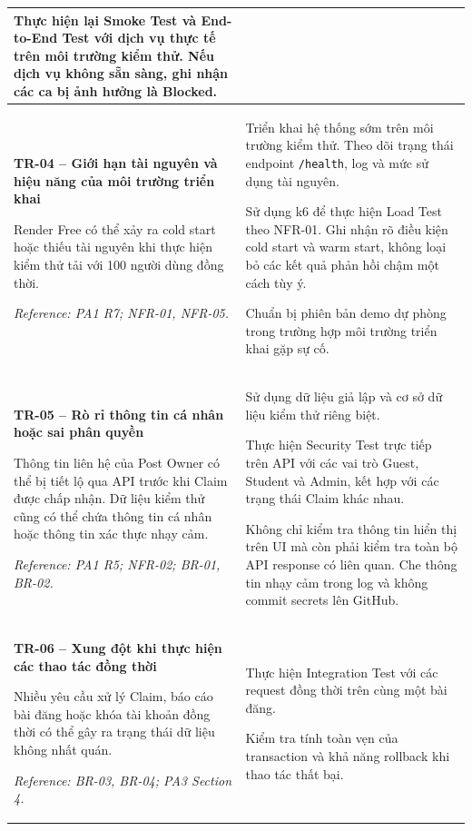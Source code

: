 \begin{longtable}{|p{}|p{}|}
Thực hiện lại Smoke Test và End-to-End Test 
với dịch vụ thực tế trên môi trường kiểm thử. 
Nếu dịch vụ không sẵn sàng, ghi nhận các ca 
bị ảnh hưởng là Blocked.
\\ \hline

\textbf{TR-04 -- Giới hạn tài nguyên và hiệu năng 
của môi trường triển khai}

Render Free có thể xảy ra cold start hoặc 
thiếu tài nguyên khi thực hiện kiểm thử tải 
với 100 người dùng đồng thời.

\textit{Reference: PA1 R7; NFR-01, NFR-05.}
&
Triển khai hệ thống sớm trên môi trường kiểm thử. 
Theo dõi trạng thái endpoint \texttt{/health}, 
log và mức sử dụng tài nguyên.

Sử dụng k6 để thực hiện Load Test theo NFR-01. 
Ghi nhận rõ điều kiện cold start và warm start, 
không loại bỏ các kết quả phản hồi chậm 
một cách tùy ý.

Chuẩn bị phiên bản demo dự phòng trong trường hợp 
môi trường triển khai gặp sự cố.
\\ \hline

\textbf{TR-05 -- Rò rỉ thông tin cá nhân hoặc 
sai phân quyền}

Thông tin liên hệ của Post Owner có thể bị 
tiết lộ qua API trước khi Claim được chấp nhận. 
Dữ liệu kiểm thử cũng có thể chứa thông tin 
cá nhân hoặc thông tin xác thực nhạy cảm.

\textit{Reference: PA1 R5; NFR-02; BR-01, BR-02.}
&
Sử dụng dữ liệu giả lập và cơ sở dữ liệu kiểm thử 
riêng biệt.

Thực hiện Security Test trực tiếp trên API 
với các vai trò Guest, Student và Admin, 
kết hợp với các trạng thái Claim khác nhau.

Không chỉ kiểm tra thông tin hiển thị trên UI 
mà còn phải kiểm tra toàn bộ API response 
có liên quan. Che thông tin nhạy cảm trong log 
và không commit secrets lên GitHub.
\\ \hline

\textbf{TR-06 -- Xung đột khi thực hiện 
các thao tác đồng thời}

Nhiều yêu cầu xử lý Claim, báo cáo bài đăng 
hoặc khóa tài khoản đồng thời có thể gây ra 
trạng thái dữ liệu không nhất quán.

\textit{Reference: BR-03, BR-04; PA3 Section 4.}
&
Thực hiện Integration Test với các request 
đồng thời trên cùng một bài đăng.

Kiểm tra tính toàn vẹn của transaction và 
khả năng rollback khi thao tác thất bại.


\end{longtable}
